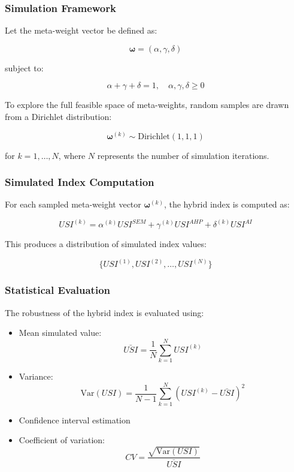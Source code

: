 \documentclass[11pt,a4paper]{article}
\begin{document}
\subsubsection{Simulation Framework}

Let the meta-weight vector be defined as:

\[
\boldsymbol{\omega} = (\alpha, \gamma, \delta)
\]

subject to:

\[
\alpha + \gamma + \delta = 1, \quad \alpha, \gamma, \delta \geq 0
\]

To explore the full feasible space of meta-weights, random samples are drawn from a Dirichlet distribution:

\begin{equation}
\boldsymbol{\omega}^{(k)} \sim \text{Dirichlet}(1,1,1)
\end{equation}

for $k = 1, \dots, N$, where $N$ represents the number of simulation iterations.

\subsubsection{Simulated Index Computation}

For each sampled meta-weight vector $\boldsymbol{\omega}^{(k)}$, the hybrid index is computed as:

\begin{equation}
USI^{(k)} =
\alpha^{(k)} USI^{SEM}
+
\gamma^{(k)} USI^{AHP}
+
\delta^{(k)} USI^{AI}
\end{equation}

This produces a distribution of simulated index values:

\[
\{USI^{(1)}, USI^{(2)}, \dots, USI^{(N)}\}
\]

\subsubsection{Statistical Evaluation}

The robustness of the hybrid index is evaluated using:

\begin{itemize}
\item Mean simulated value:
\[
\bar{USI} = \frac{1}{N} \sum_{k=1}^{N} USI^{(k)}
\]

\item Variance:
\[
\text{Var}(USI) = \frac{1}{N-1} \sum_{k=1}^{N} (USI^{(k)} - \bar{USI})^2
\]

\item Confidence interval estimation
\item Coefficient of variation:
\[
CV = \frac{\sqrt{\text{Var}(USI)}}{\bar{USI}}
\]
\end{itemize}
\end{document}
